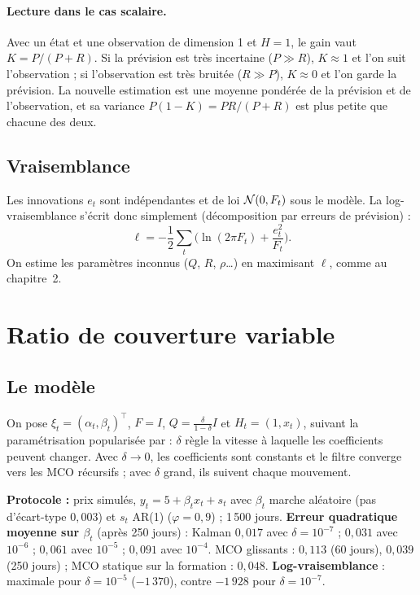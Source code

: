 \paragraph{Lecture dans le cas scalaire.} Avec un état et une observation de dimension 1 et $H = 1$, le gain vaut $K = P/(P+R)$. Si la prévision est très incertaine ($P\gg R$), $K\approx1$ et l'on suit l'observation ; si l'observation est très bruitée ($R\gg P$), $K\approx0$ et l'on garde la prévision. La nouvelle estimation est une moyenne pondérée de la prévision et de l'observation, et sa variance $P(1-K) = PR/(P+R)$ est plus petite que chacune des deux.

\subsection{Vraisemblance}

Les innovations $e_t$ sont indépendantes et de loi $\mathcal{N}(0, F_t)$ sous le modèle. La log-vraisemblance s'écrit donc simplement (décomposition par erreurs de prévision) :
\[
\ell = -\frac12\sum_t\Big(\ln(2\pi F_t) + \frac{e_t^2}{F_t}\Big).
\]
On estime les paramètres inconnus ($Q$, $R$, $\rho$\dots) en maximisant $\ell$, comme au chapitre~2.

\section{Ratio de couverture variable}

\subsection{Le modèle}

On pose $\xi_t = (\alpha_t, \beta_t)^\top$, $F = I$, $Q = \frac{\delta}{1-\delta}I$ et $H_t = (1, x_t)$, suivant la paramétrisation popularisée par \citet{chan2013} : $\delta$ règle la vitesse à laquelle les coefficients peuvent changer. Avec $\delta\to0$, les coefficients sont constants et le filtre converge vers les MCO récursifs ; avec $\delta$ grand, ils suivent chaque mouvement.

\begin{codebox}
\textbf{Protocole :} prix simulés, $y_t = 5 + \beta_tx_t + s_t$ avec $\beta_t$ marche aléatoire (pas d'écart-type $0{,}003$) et $s_t$ AR(1) ($\varphi = 0{,}9$) ; 1\,500 jours. \textbf{Erreur quadratique moyenne sur $\beta_t$} (après 250 jours) : Kalman $0{,}017$ avec $\delta = 10^{-7}$ ; $0{,}031$ avec $10^{-6}$ ; $0{,}061$ avec $10^{-5}$ ; $0{,}091$ avec $10^{-4}$. MCO glissants : $0{,}113$ (60 jours), $0{,}039$ (250 jours) ; MCO statique sur la formation : $0{,}048$. \textbf{Log-vraisemblance} : maximale pour $\delta = 10^{-5}$ ($-1\,370$), contre $-1\,928$ pour $\delta = 10^{-7}$.
\end{codebox}

